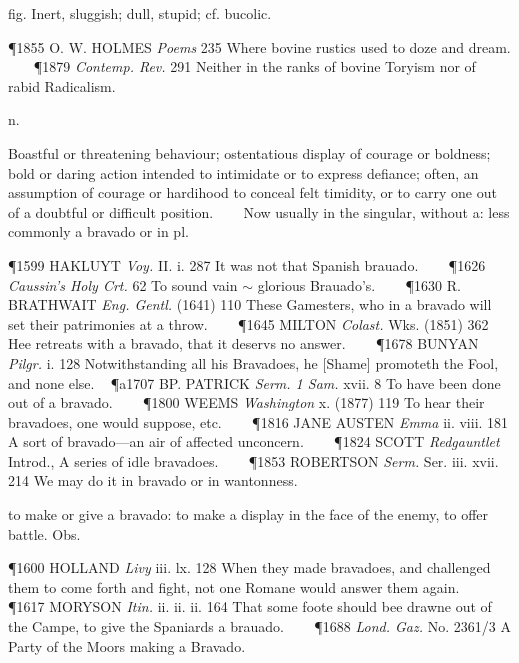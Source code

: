 \begin{description}[wide, labelwidth=!, labelindent=0pt]
 fig. Inert, sluggish; dull, stupid; cf. bucolic.

\P 1855 O. W. HOLMES  \textit{Poems} 235 Where bovine rustics used to doze and dream.    
\P 1879 \textit{Contemp.  Rev.} 291 Neither in the ranks of bovine Toryism nor of rabid Radicalism.



 n.

\noindent {}


\vspace{-0.3cm}

\begin{myenumerate}

 Boastful or threatening behaviour; ostentatious display of courage or boldness; bold or daring action intended to intimidate or to express defiance; often, an assumption of courage or hardihood to conceal felt timidity, or to carry one out of a doubtful or difficult position.
   
Now usually in the singular, without a: less commonly a bravado or in pl.

\P 1599 HAKLUYT  \textit{Voy.} II. i. 287 It was not that Spanish brauado.    
\P 1626 \textit{Caussin's  Holy Crt.} 62 To sound vain $\sim$ glorious Brauado's.    
\P 1630 R. BRATHWAIT  \textit{Eng. Gentl.} (1641) 110 These Gamesters, who in a bravado will set their patrimonies at a throw.    
\P 1645 MILTON  \textit{Colast.} Wks. (1851) 362 Hee retreats with a bravado, that it deservs no answer.    
\P 1678 BUNYAN  \textit{Pilgr.} i. 128 Notwithstanding all his Bravadoes, he [Shame] promoteth the Fool, and none else.  
\P a1707 BP. PATRICK  \textit{Serm. 1 Sam.} xvii. 8 To have been done out of a bravado.    
\P 1800 WEEMS  \textit{Washington} x. (1877) 119 To hear their bravadoes, one would suppose, etc.    
\P 1816 JANE AUSTEN  \textit{Emma} ii. viii. 181 A sort of bravado—an air of affected unconcern.    
\P 1824 SCOTT  \textit{Redgauntlet} Introd., A series of idle bravadoes.    
\P 1853 ROBERTSON  \textit{Serm.} Ser. iii. xvii. 214 We may do it in bravado or in wantonness.

 to make or give a bravado: to make a display in the face of the enemy, to offer battle. Obs.

\P 1600 HOLLAND  \textit{Livy} iii. lx. 128 When they made bravadoes, and challenged them to come forth and fight, not one Romane would answer them again.    
\P 1617 MORYSON  \textit{Itin.} ii. ii. ii. 164 That some foote should bee drawne out of the Campe, to give the Spaniards a brauado.    
\P 1688 \textit{Lond. Gaz.} No. 2361/3 A Party of the Moors making a Bravado.


\end{myenumerate}
\end{description}
